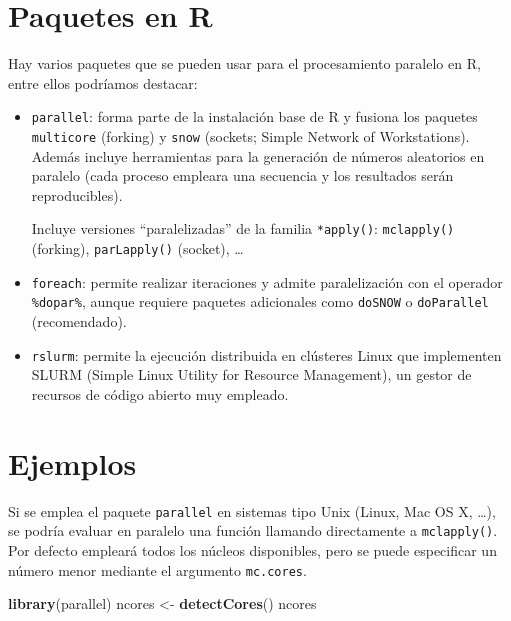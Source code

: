 \documentclass[
]{book}
\newenvironment{Shaded}{\begin{snugshade}}{\end{snugshade}}
\newcommand{\KeywordTok}[1]{\textcolor[rgb]{0.13,0.29,0.53}{\textbf{#1}}}
\newcommand{\NormalTok}[1]{#1}
\newcommand{\StringTok}[1]{\textcolor[rgb]{0.31,0.60,0.02}{#1}}
\theoremstyle{break}
\theoremstyle{definition}
\theoremstyle{definition}
\theoremstyle{definition}
\theoremstyle{remark}
\begin{document}
\hypertarget{paquetes-en-r}{%
\section{Paquetes en R}\label{paquetes-en-r}}

Hay varios paquetes que se pueden usar para el procesamiento paralelo en R,
entre ellos podríamos destacar:

\begin{itemize}
\item
  \texttt{parallel}: forma parte de la instalación base de R y fusiona los paquetes
  \texttt{multicore} (forking) y \texttt{snow} (sockets; Simple Network of Workstations).
  Además incluye herramientas para la generación de números aleatorios en paralelo
  (cada proceso empleara una secuencia y los resultados serán reproducibles).

  Incluye versiones ``paralelizadas'' de la familia \texttt{*apply()}:
  \texttt{mclapply()} (forking), \texttt{parLapply()} (socket), \ldots{}
\item
  \texttt{foreach}: permite realizar iteraciones y admite paralelización con el operador \texttt{\%dopar\%},
  aunque requiere paquetes adicionales como \texttt{doSNOW} o \texttt{doParallel} (recomendado).
\item
  \texttt{rslurm}: permite la ejecución distribuida en clústeres Linux que implementen
  SLURM (Simple Linux Utility for Resource Management),
  un gestor de recursos de código abierto muy empleado.
\end{itemize}

\hypertarget{ejemplos-3}{%
\section{Ejemplos}\label{ejemplos-3}}

Si se emplea el paquete \texttt{parallel} en sistemas tipo Unix (Linux, Mac OS X, \ldots), se podría
evaluar en paralelo una función llamando directamente a \texttt{mclapply()}.
Por defecto empleará todos los núcleos disponibles, pero se puede especificar un número menor
mediante el argumento \texttt{mc.cores}.

\begin{Shaded}
\begin{Highlighting}[]
\KeywordTok{library}\NormalTok{(parallel)}
\NormalTok{ncores <-}\StringTok{ }\KeywordTok{detectCores}\NormalTok{()}
\NormalTok{ncores}
\end{Highlighting}
\end{Shaded}
\end{document}
